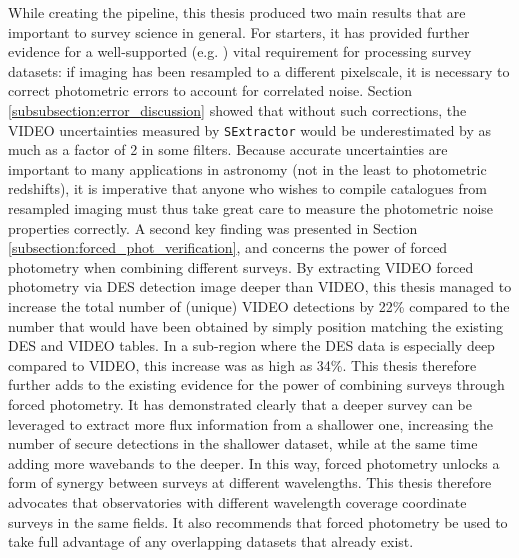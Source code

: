 While creating the \DESVIDEO pipeline, this thesis  produced two main results that are important to survey science in general. For starters, it has provided further evidence for a well-supported (e.g. \citealt{2003AJ....125.1107L,2006ApJS..162....1G,2011ApJ...735...86W,2013ApJS..206....8M}) vital requirement for processing survey datasets: if imaging has been resampled to a different pixelscale, it is necessary to correct photometric errors to account for correlated noise. Section \ref{subsubsection:error_discussion} showed that without such corrections, the VIDEO uncertainties measured by \texttt{SExtractor} would be underestimated by as much as a factor of 2 in some filters. Because accurate uncertainties are important to many applications in astronomy (not in the least to photometric redshifts), it is imperative that anyone who wishes to compile catalogues from resampled imaging must thus take great care to measure the photometric noise properties correctly. A second key finding was presented in Section \ref{subsection:forced_phot_verification}, and concerns the power of forced photometry when combining different surveys. By extracting VIDEO forced photometry via DES detection image deeper than VIDEO, this thesis managed to increase the total number of (unique) VIDEO detections by 22\% compared to the number that would have been obtained by simply position matching the existing DES and VIDEO tables. In a sub-region where the DES data is especially deep compared to VIDEO, this increase was as high as 34\%. This thesis therefore further adds to the existing evidence for the power of combining surveys through forced photometry. It has demonstrated clearly that a deeper survey can be leveraged to extract more flux information from a shallower one, increasing the number of secure detections in the shallower dataset, while at the same time adding more wavebands to the deeper. In this way, forced photometry unlocks a form of synergy between surveys at different wavelengths. This thesis therefore advocates that observatories with different wavelength coverage coordinate surveys in the same fields. It also recommends that forced photometry be used to take full advantage of any overlapping datasets that already exist. \par 




